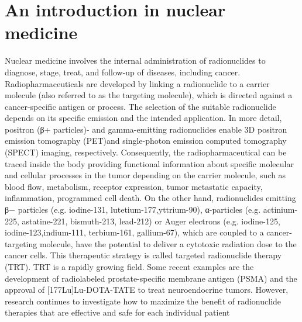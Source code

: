 \documentclass{article}
\begin{document}
\section*{ An introduction in nuclear medicine}
Nuclear medicine involves the internal administration of radionuclides to diagnose, stage, treat, and follow-up of diseases, including cancer. Radiopharmaceuticals are developed by linking a radionuclide to a carrier molecule (also referred to as the targeting molecule), which is directed against a cancer-specific antigen or process. The selection of the suitable radionuclide depends on its specific emission and the intended application. In more detail, positron (β+ particles)- and gamma-emitting radionuclides enable 3D positron emission tomography (PET)and single-photon emission computed tomography (SPECT) imaging, respectively. Consequently, the radiopharmaceutical can be traced inside the body providing functional information about specific molecular and cellular processes in the tumor depending on the carrier molecule, such as blood flow, metabolism, receptor expression, tumor metastatic capacity, inflammation, programmed cell death. On the other hand, radionuclides emitting β− particles (e.g. iodine-131, lutetium-177,yttrium-90), α-particles (e.g. actinium-225, astatine-221, bismuth-213, lead-212) or Auger electrons (e.g. iodine-125, iodine-123,indium-111, terbium-161, gallium-67), which are coupled to a cancer-targeting molecule, have the potential to deliver a cytotoxic radiation dose to the cancer cells. This therapeutic strategy is called targeted radionuclide therapy (TRT). TRT is a rapidly growing field. Some recent examples are the development of radiolabeled prostate-specific membrane antigen (PSMA) and the approval of [177Lu]Lu-DOTA-TATE to treat neuroendocrine tumors. However, research continues to investigate how to maximize the benefit of radionuclide therapies that are effective and safe for each individual patient 
\end{document}
